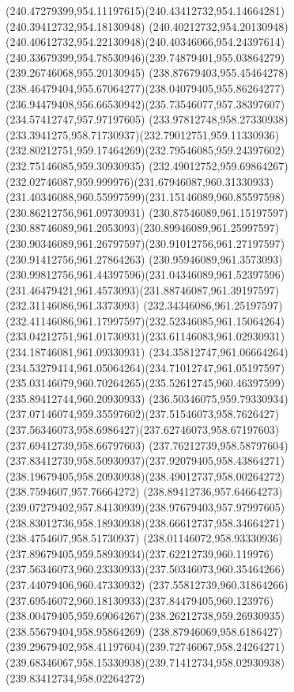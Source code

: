 {{  \curveto(240.47279399,954.11197615)(240.43412732,954.14664281)(240.39412732,954.18130948)
  \curveto(240.40212732,954.20130948)(240.40612732,954.22130948)(240.40346066,954.24397614)
  \curveto(240.33679399,954.78530946)(239.74879401,955.03864279)(239.26746068,955.20130945)
  \curveto(238.87679403,955.45464278)(238.46479404,955.67064277)(238.04079405,955.86264277)
  \curveto(236.94479408,956.66530942)(235.73546077,957.38397607)(234.57412747,957.97197605)
  \curveto(233.97812748,958.27330938)(233.3941275,958.71730937)(232.79012751,959.11330936)
  \curveto(232.80212751,959.17464269)(232.79546085,959.24397602)(232.75146085,959.30930935)
  \curveto(232.49012752,959.69864267)(232.02746087,959.999976)(231.67946087,960.31330933)
  \curveto(231.40346088,960.55997599)(231.15146089,960.85597598)(230.86212756,961.09730931)
  \curveto(230.87546089,961.15197597)(230.88746089,961.2053093)(230.89946089,961.25997597)
  \curveto(230.90346089,961.26797597)(230.91012756,961.27197597)(230.91412756,961.27864263)
  \curveto(230.95946089,961.3573093)(230.99812756,961.44397596)(231.04346089,961.52397596)
  \curveto(231.46479421,961.4573093)(231.88746087,961.39197597)(232.31146086,961.3373093)
  \curveto(232.34346086,961.25197597)(232.41146086,961.17997597)(232.52346085,961.15064264)
  \curveto(233.04212751,961.01730931)(233.61146083,961.02930931)(234.18746081,961.09330931)
  \curveto(234.35812747,961.06664264)(234.53279414,961.05064264)(234.71012747,961.05197597)
  \curveto(235.03146079,960.70264265)(235.52612745,960.46397599)(235.89412744,960.20930933)
  \curveto(236.50346075,959.79330934)(237.07146074,959.35597602)(237.51546073,958.7626427)
  \curveto(237.56346073,958.6986427)(237.62746073,958.67197603)(237.69412739,958.66797603)
  \curveto(237.76212739,958.58797604)(237.83412739,958.50930937)(237.92079405,958.43864271)
  \curveto(238.19679405,958.20930938)(238.49012737,958.00264272)(238.7594607,957.76664272)
  \curveto(238.89412736,957.64664273)(239.07279402,957.84130939)(238.97679403,957.97997605)
  \curveto(238.83012736,958.18930938)(238.66612737,958.34664271)(238.4754607,958.51730937)
  \curveto(238.01146072,958.93330936)(237.89679405,959.58930934)(237.62212739,960.119976)
  \curveto(237.56346073,960.23330933)(237.50346073,960.35464266)(237.44079406,960.47330932)
  \curveto(237.55812739,960.31864266)(237.69546072,960.18130933)(237.84479405,960.123976)
  \curveto(238.00479405,959.69064267)(238.26212738,959.26930935)(238.55679404,958.95864269)
  \curveto(238.87946069,958.6186427)(239.29679402,958.41197604)(239.72746067,958.24264271)
  \curveto(239.68346067,958.15330938)(239.71412734,958.02930938)(239.83412734,958.02264272)
}}
